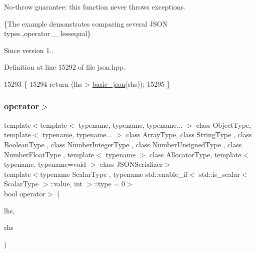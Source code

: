 No-\/throw guarantee\+: this function never throws exceptions.

\{The example demonstrates comparing several J\+S\+ON types.,operator\+\_\+\+\_\+lessequal\}

\begin{DoxySince}{Since}
version 1.. 
\end{DoxySince}


Definition at line 15292 of file json.\+hpp.


\begin{DoxyCode}
15293     \{
15294         \textcolor{keywordflow}{return} (lhs > \hyperlink{classnlohmann_1_1basic__json_aed115142bd0c6c66c864700e0467df55}{basic\_json}(rhs));
15295     \}
\end{DoxyCode}
\mbox{\label{classnlohmann_1_1basic__json_a124c319566198d9f092c5bebea46ce77}} 
\subsubsection{\texorpdfstring{operator$>$}{operator>}\hspace{0.1cm}{\footnotesize\ttfamily [3/3]}}
{\footnotesize\ttfamily template$<$template$<$ typename, typename, typename... $>$ class Object\+Type, template$<$ typename, typename... $>$ class Array\+Type, class String\+Type , class Boolean\+Type , class Number\+Integer\+Type , class Number\+Unsigned\+Type , class Number\+Float\+Type , template$<$ typename $>$ class Allocator\+Type, template$<$ typename, typename=void $>$ class J\+S\+O\+N\+Serializer$>$ \\
template$<$typename Scalar\+Type , typename std\+::enable\+\_\+if$<$ std\+::is\+\_\+scalar$<$ Scalar\+Type $>$\+::value, int $>$\+::type  = 0$>$ \\
bool operator$>$ (\begin{DoxyParamCaption}\item[{const Scalar\+Type}]{lhs,  }\item[{\hyperlink{classnlohmann_1_1basic__json_a4057c5425f4faacfe39a8046871786ca}{const\+\_\+reference}}]{rhs }\end{DoxyParamCaption})\hspace{0.3cm}{\ttfamily [friend]}}



